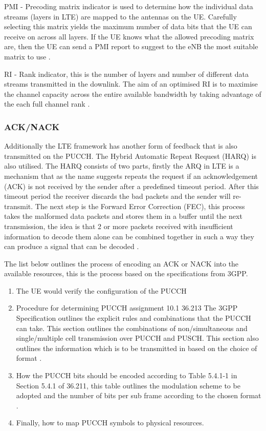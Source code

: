 \documentclass{article}
\begin{document}
PMI - Precoding matrix indicator is used to determine how the individual data streams (layers in LTE) are mapped to the antennas on the UE. Carefully selecting this matrix yields the maximum number of data bits that the UE can receive on across all layers. If the UE knows what the allowed precoding matrix are, then the UE can send a PMI report to suggest to the eNB the most suitable matrix to use \cite{csi_defs}.

RI - Rank indicator,  this is the number of layers and number of different data streams transmitted in the downlink. The aim of an optimised RI is to maximise the channel capacity across the entire available bandwidth by taking advantage of the each full channel rank  \cite{csi_defs}. 

\subsubsection{ACK/NACK}

Additionally the LTE framework has another form of feedback that is also transmitted on the PUCCH. The Hybrid Automatic Repeat Request (HARQ) is also utilised. The HARQ consists of two parts, firstly the ARQ in LTE is a mechanism that as the name suggests repeats the request if an acknowledgement (ACK) is not received by the sender after a predefined timeout period.  After this timeout period the receiver discards the bad packets and the sender will re-transmit. The next step is the Forward Error Correction (FEC), this process takes the malformed data packets and stores them in a buffer until the next transmission, the idea is that 2 or more packets received with insufficient information to decode them alone can be combined together in such a way they can produce a signal that can be decoded \cite[5.3.2 HARQ operation]{3gpp36321}.

The list below outlines the process of encoding an ACK or NACK into the available resources, this is the process based on the specifications from 3GPP.
\begin{enumerate}\label{proc_pucch_configs}
    \item The UE would verify the configuration of the PUCCH \cite[Section 5.4]{36211}
    \item Procedure for determining PUCCH assignment 10.1 36.213 The 3GPP Specification outlines the explicit rules and combinations that the PUCCH can take. This section outlines the combinations of non/simultaneous and single/multiple cell transmission over PUCCH and PUSCH. This section also outlines the information which is to be transmitted in based on the choice of format \cite[Section 10.1]{36211}. 
    \item How the PUCCH bits should be encoded according to Table 5.4.1-1 in Section 5.4.1 of 36.211, this table outlines the modulation scheme to be adopted and the number of bits per sub frame according to the chosen format \cite[Table 5.4.1-1]{36211}.
    \item Finally, how to map PUCCH symbols to physical resources\cite[Section 5.4.3]{36211}.  
\end{enumerate} 
\end{document}
